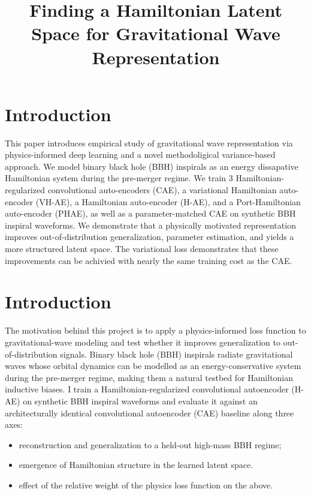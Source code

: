 \documentclass[conference]{IEEEtran}
\begin{document}
\title{Finding a Hamiltonian Latent Space for Gravitational Wave Representation}

\author{
}

\maketitle

\section{Introduction}

This paper introduces empirical study of gravitational wave representation via physics-informed deep learning and a novel methodoligical variance-based approach. We model binary black hole (BBH) inspirals as an energy dissapative Hamiltonian system during the pre-merger regime. We train 3 Hamiltonian-regularized convolutional auto-encoders (CAE), a variational Hamiltonian auto-encoder (VH-AE), a Hamiltonian auto-encoder (H-AE), and a Port-Hamiltonian auto-encoder (PHAE), as well as a parameter-matched CAE on synthetic BBH inspiral waveforms. 
We demonstrate that a physically motivated representation improves out-of-distribution generalization, parameter estimation, and yields a more structured latent space. The variational loss demonstrates that these improvements can be achivied with nearly the same training cost as the CAE. 
\section{Introduction}
The motivation behind this project is to apply a physics-informed loss function to gravitational-wave modeling and test whether it improves generalization to out-of-distribution signals. Binary black hole (BBH) inspirals radiate gravitational waves whose orbital dynamics can be modelled as an energy-conservative system during the pre-merger regime, making them a natural testbed for Hamiltonian inductive biases. I train a Hamiltonian-regularized convolutional autoencoder (H-AE) on synthetic BBH inspiral waveforms and evaluate it against an architecturally identical convolutional autoencoder (CAE) baseline along three axes:
\begin{itemize}
\item reconstruction and generalization to a held-out high-mass BBH regime;
\item emergence of Hamiltonian structure in the learned latent space.
\item effect of the relative weight of the physics loss function on the above.
\end{itemize}
\end{document}
